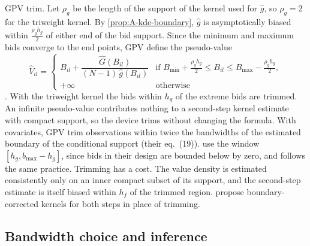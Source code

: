 GPV trim. Let $\rho_g$ be the length of the support of the kernel used for $\hat g$, so $\rho_g=2$ for
the triweight kernel. By \cref{prop:A-kde-boundary}, $\hat g$ is asymptotically biased within
$\frac{\rho_gh_g}{2}$ of either end of the bid support. Since the minimum and maximum bids converge to the
end points, GPV define the pseudo-value
\begin{equation}\label{eq:A-gpv-trim}
\hat V_{il}=\begin{cases}
B_{il}+\dfrac{\hat G(B_{il})}{(N-1)\,\hat g(B_{il})} & \text{if } B_{\min}+\frac{\rho_gh_g}{2}\le B_{il}\le B_{\max}-\frac{\rho_gh_g}{2},\\[6pt]
+\infty & \text{otherwise}
\end{cases}
\end{equation}
\citep[eq.~(6)]{GuerrePerrigneVuong2000}. With the triweight kernel the bids within $h_g$ of the extreme
bids are trimmed. An infinite pseudo-value contributes nothing to a second-step kernel estimate with
compact support, so the device trims without changing the formula. With covariates, GPV trim
observations within twice the bandwidths of the estimated boundary of the conditional support (their
eq.~(19)). \citet[eq.~(14)]{LiPerrigneVuong2002} use the window $[h_g,b_{\max}-h_g]$, since bids in their
design are bounded below by zero, and \citet[p.~749]{Asker2010} follows the same practice. Trimming has
a cost. The value density is estimated consistently only on an inner compact subset of its support, and
the second-step estimate is itself biased within $h_f$ of the trimmed region. \citet{HickmanHubbard2015}
propose boundary-corrected kernels for both steps in place of trimming.

\subsection{Bandwidth choice and inference}\label{sec:A-kde-bandwidth}

